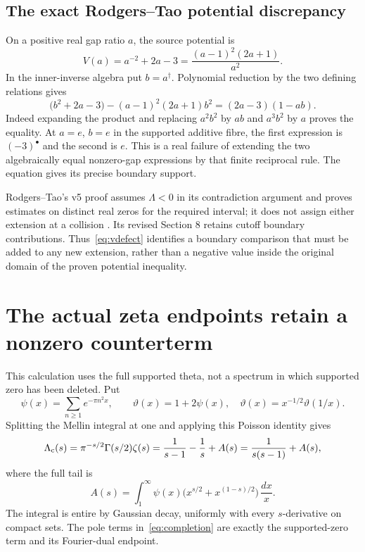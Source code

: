 \documentclass[11pt,a4paper]{article}
\theoremstyle{definition}\newtheorem{definition}[theorem]{Definition}\newtheorem{remark}[theorem]{Remark}
\begin{document}
\subsection{The exact Rodgers--Tao potential discrepancy}
On a positive real gap ratio $a$, the source potential is
\[
 V(a)=a^{-2}+2a-3=\frac{(a-1)^2(2a+1)}{a^2}.
\]
In the inner-inverse algebra put $b=a^\dagger$. Polynomial reduction by the two defining relations gives
\begin{equation}
 \bigl(b^2+2a-3\bigr)-(a-1)^2(2a+1)b^2
 =(2a-3)(1-ab).                                         \label{eq:vdefect}
\end{equation}
Indeed expanding the product and replacing $a^2b^2$ by $ab$ and $a^3b^2$ by $a$ proves the equality. At $a=e$, $b=e$ in the supported additive fibre, the first expression is $(-3)^\bullet$ and the second is $e$. This is a real failure of extending the two algebraically equal nonzero-gap expressions by that finite reciprocal rule. The equation gives its precise boundary support.

Rodgers--Tao's v5 proof assumes $\Lambda<0$ in its contradiction argument and proves estimates on distinct real zeros for the required interval; it does not assign either extension at a collision \cite[Sections 4--9]{RT}. Its revised Section 8 retains cutoff boundary contributions. Thus~\eqref{eq:vdefect} identifies a boundary comparison that must be added to any new extension, rather than a negative value inside the original domain of the proven potential inequality.

\section{The actual zeta endpoints retain a nonzero counterterm}\label{sec:endpoints}
This calculation uses the full supported theta, not a spectrum in which supported zero has been deleted. Put
\[
 \psi(x)=\sum_{n\ge1}e^{-\pi n^2x},\qquad
 \vartheta(x)=1+2\psi(x),\quad\vartheta(x)=x^{-1/2}\vartheta(1/x).
\]
Splitting the Mellin integral at one and applying this Poisson identity gives
\begin{equation}
 \Lambda_{\rm c}(s)=\pi^{-s/2}\Gamma(s/2)\zeta(s)
 =\frac1{s-1}-\frac1s+A(s)=\frac1{s(s-1)}+A(s),           \label{eq:completion}
\end{equation}
where the full tail is
\begin{equation}
 A(s)=\int_1^\infty\psi(x)
       \bigl(x^{s/2}+x^{(1-s)/2}\bigr)\,\frac{dx}{x}.    \label{eq:tail}
\end{equation}
The integral is entire by Gaussian decay, uniformly with every $s$-derivative on compact sets. The pole terms in~\eqref{eq:completion} are exactly the supported-zero term and its Fourier-dual endpoint.
\end{document}
